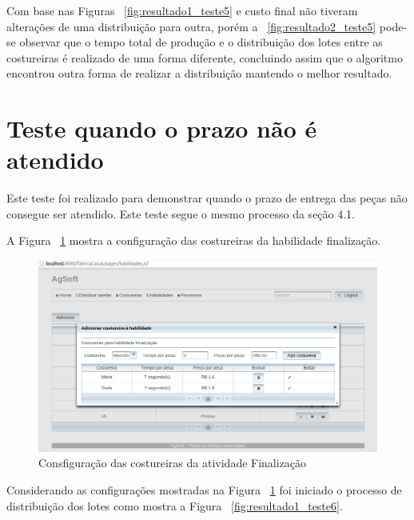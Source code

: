 \par Com base nas Figuras ~\ref{fig:resultado1_teste5} e
custo final não tiveram alterações de uma distribuição para outra, porém a
~\ref{fig:resultado2_teste5} pode-se observar que o tempo total de produção e o
distribuição dos lotes entre as costureiras é realizado de uma forma
diferente, concluindo assim que o algoritmo encontrou outra forma de realizar a
distribuição mantendo o melhor resultado.

\section{Teste quando o prazo não é atendido}

\par Este teste foi realizado para demonstrar quando o prazo de entrega das
peças não consegue ser atendido. Este teste segue o mesmo processo da seção 4.1.

\par A Figura ~\ref{fig:configuracao_costureiras_teste6} mostra a configuração
das costureiras da habilidade finalização.

\begin{figure}[h!]
	\centerline{\includegraphics[scale=0.3]{./imagens/configuracao_costureiras_teste6.png}}
	\caption[Consfiguração das costureiras da atividade Finalização] 
	{Consfiguração das costureiras da atividade Finalização}
	\label{fig:configuracao_costureiras_teste6}
\end{figure}

\par Considerando as configurações mostradas na Figura
~\ref{fig:configuracao_costureiras_teste6} foi iniciado o processo de
distribuição dos lotes como mostra a Figura ~\ref{fig:resultado1_teste6}.

